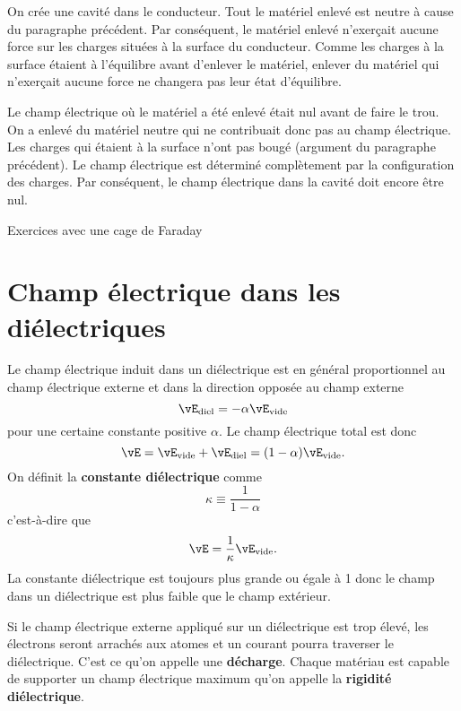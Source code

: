 On crée une cavité dans le conducteur. Tout le matériel enlevé est
neutre à cause du paragraphe précédent. Par conséquent, le matériel enlevé
n'exerçait aucune force sur les charges situées à la surface du conducteur.
Comme les charges à la surface étaient à l'équilibre avant d'enlever le
matériel, enlever du matériel qui n'exerçait aucune force ne changera pas leur
état d'équilibre.

Le champ électrique où le matériel a été enlevé était nul avant de faire le
trou. On a enlevé du matériel neutre qui ne contribuait donc pas au champ
électrique. Les charges qui étaient à la surface n'ont pas bougé (argument du
paragraphe précédent). Le champ électrique est déterminé complètement par la
configuration des charges. Par conséquent, le champ électrique dans la cavité
doit encore être nul.


\begin{diapobox}
 Exercices avec une cage de Faraday
\end{diapobox}



\section{Champ électrique dans les diélectriques}



Le champ électrique induit dans un diélectrique est en général proportionnel au
champ électrique externe et dans la direction opposée au champ externe
$$\vE_\text{diel} = -\alpha \vE_\text{vide}$$
pour une certaine constante positive $\alpha$. Le champ électrique total est
donc
$$\vE = \vE_\text{vide} + \vE_\text{diel} = (1 - \alpha) \vE_\text{vide}.$$
On définit la \textbf{constante diélectrique} comme
$$\kappa \equiv \frac{1}{1 - \alpha}$$
c'est-à-dire que
$$\vE = \frac{1}{\kappa} \vE_\text{vide}.$$
La constante diélectrique est toujours plus grande ou égale à 1 donc le champ
dans un diélectrique est plus faible que le champ extérieur.



Si le champ électrique externe appliqué sur un diélectrique est trop élevé, les
électrons seront arrachés aux atomes et un courant pourra traverser le
diélectrique. C'est ce qu'on appelle une \textbf{décharge}. Chaque matériau est
capable de supporter un champ électrique maximum qu'on appelle la
\textbf{rigidité diélectrique}.


